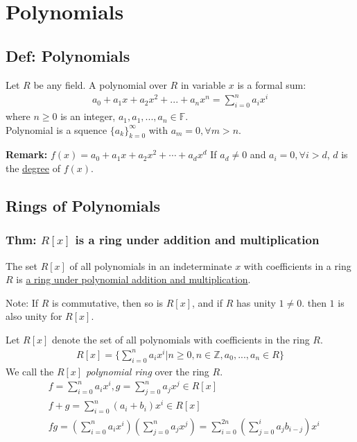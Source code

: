 \documentclass[11pt]{elegantbook}
\begin{document}
\chapter{Polynomials}
\section{Def: Polynomials}
Let $R$ be any field. A polynomial over $R$ in variable $x$ is a formal sum:
\begin{equation}
    \begin{aligned}
        a_0+a_1x+a_2x^2+...+a_nx^n=\sum_{i=0}^na_ix^i
    \end{aligned}
    \nonumber
\end{equation}
where $n\geq 0$ is an integer, $a_1,a_1,...,a_n\in\mathbb{F}$.\\
Polynomial is a squence $\{a_k\}_{k=0}^{\infty}$ with $a_m=0,\forall m>n$.

\textbf{Remark:} $f(x)=a_0+a_1x+a_2x^2+\cdots+a_dx^d$ If $a_d\neq 0$ and $a_i=0,\forall i>d$, $d$ is the \underline{degree} of $f(x)$.

\section{Rings of Polynomials}
\subsection{Thm: $R[x]$ is a ring under addition and multiplication}
\begin{theorem}
    The set $R[x]$ of all polynomials in an indeterminate $x$ with coefficients in a ring $R$ is \underline{a ring under polynomial addition and multiplication}.
    
    Note: If $R$ is commutative, then so is $R[x]$,
    and if $R$ has unity $1\neq 0$. then $1$ is also unity for $R[x]$.
\end{theorem}
Let $R[x]$ denote the set of all polynomials with coefficients in the ring $R$.
\begin{equation}
    \begin{aligned}
        R[x]=\{\sum_{i=0}^na_ix^i|n\geq0,n\in\mathbb{Z}, a_0,...,a_n\in R\}
    \end{aligned}
    \nonumber
\end{equation}
We call the $R[x]$ \textit{polynomial ring} over the ring $R$.
\begin{equation}
    \begin{aligned}
        &f=\sum_{i=0}^na_ix^i, g=\sum_{j=0}^na_jx^j \in R[x]\\
        &f+g=\sum_{i=0}^n(a_i+b_i)x^i\in R[x]\\
        &fg=(\sum_{i=0}^na_ix^i)(\sum_{j=0}^na_jx^j)=\sum_{i=0}^{2n}(\sum_{j=0}^ia_jb_{i-j})x^i
    \end{aligned}
    \nonumber
\end{equation}
\end{document}
